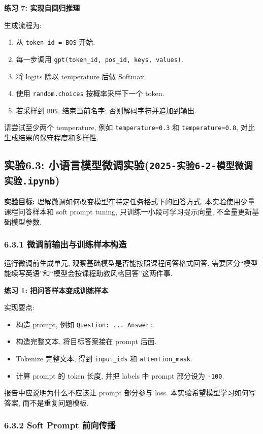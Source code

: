 \documentclass{../../nndlcourse}
\begin{document}
\textbf{练习 7: 实现自回归推理}

生成流程为:
\begin{enumerate}
    \item 从 \texttt{token\_id = BOS} 开始.
    \item 每一步调用 \texttt{gpt(token\_id, pos\_id, keys, values)}.
    \item 将 logits 除以 temperature 后做 Softmax.
    \item 使用 \texttt{random.choices} 按概率采样下一个 token.
    \item 若采样到 \texttt{BOS}, 结束当前名字; 否则解码字符并追加到输出.
\end{enumerate}
请尝试至少两个 temperature, 例如 \texttt{temperature=0.3} 和 \texttt{temperature=0.8}, 对比生成结果的保守程度和多样性.

\subsection*{实验6.3: 小语言模型微调实验(\texttt{2025-实验6-2-模型微调实验.ipynb})}

\textbf{实验目标: }理解微调如何改变模型在特定任务格式下的回答方式. 本实验使用少量课程问答样本和 soft prompt tuning, 只训练一小段可学习提示向量, 不全量更新基础模型参数.

\subsubsection*{6.3.1 微调前输出与训练样本构造}

运行微调前生成单元, 观察基础模型是否能按照课程问答格式回答. 需要区分``模型能续写英语''和``模型会按课程助教风格回答''这两件事.

\textbf{练习 1: 把问答样本变成训练样本}

实现要点:
\begin{itemize}
    \item 构造 prompt, 例如 \texttt{Question: ... Answer:}.
    \item 构造完整文本, 将目标答案接在 prompt 后面.
    \item Tokenize 完整文本, 得到 \texttt{input\_ids} 和 \texttt{attention\_mask}.
    \item 计算 prompt 的 token 长度, 并把 labels 中 prompt 部分设为 \texttt{-100}.
\end{itemize}
报告中应说明为什么不应该让 prompt 部分参与 loss. 本实验希望模型学习如何写答案, 而不是重复问题模板.

\subsubsection*{6.3.2 Soft Prompt 前向传播}
\end{document}
